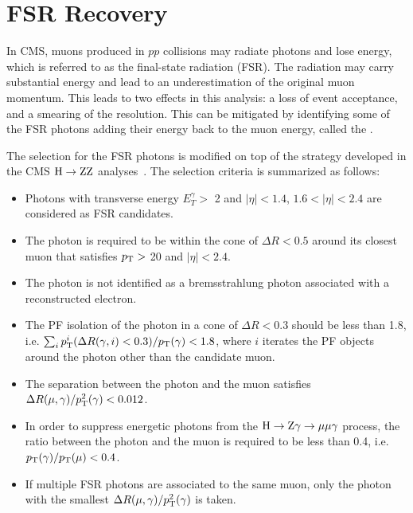 \section{FSR Recovery} \label{sec:fsr}

In CMS, muons produced in $pp$ collisions may radiate photons and lose energy, which is referred to as the final-state radiation (FSR).
The radiation may carry substantial energy and lead to an underestimation of the original muon momentum.
This leads to two effects in this analysis:
a loss of event acceptance, and a smearing of the \mmm resolution.
This can be mitigated by identifying some of the FSR photons adding their energy back to the muon energy, called the \FSR.

The selection for the FSR photons is modified on top of the strategy developed in the CMS $\mathrm{H} \to \mathrm{Z}\mathrm{Z}$ analyses~\cite{Sirunyan:2017exp, Sirunyan:2018qlb}.
The selection criteria is summarized as follows:
\begin{itemize}
  \item Photons with transverse energy $E^{\gamma}_{T} > $ 2 \GeV and $|\eta|<1.4$, $1.6<|\eta|<2.4$ are considered as FSR candidates.
  \item The photon is required to be within the cone of $\Delta{}R<0.5$ around its closest muon that satisfies $p_{\mathrm{T}} >$ 20 \GeV and $|\eta| < 2.4$.
  \item The photon is not identified as a bremsstrahlung photon associated with a reconstructed electron.
  \item The PF isolation of the photon in a cone of $\Delta{}R < 0.3$ should be less than 1.8, i.e. $\sum_{i}p_{\mathrm{T}}^{i}(\Delta{}R(\gamma, i)<0.3)/p_{\mathrm{T}}(\gamma) < 1.8$, 
        where $i$ iterates the PF objects around the photon other than the candidate muon.
  \item The separation between the photon and the muon satisfies $\Delta{}R(\mu, \gamma)/p_{\mathrm{T}}^{2}(\gamma) < 0.012$.
  \item In order to suppress energetic photons from the $\mathrm{H} \to \mathrm{Z}\gamma \to \mu\mu\gamma$ process,
        the \pt ratio between the photon and the muon is required to be less than 0.4, i.e. $p_{\mathrm{T}}(\gamma)/p_{\mathrm{T}}(\mu) < 0.4$.
  \item If multiple FSR photons are associated to the same muon, only the photon with the smallest $\Delta{}R(\mu, \gamma)/p_{\mathrm{T}}^{2}(\gamma)$ is taken.
\end{itemize}

